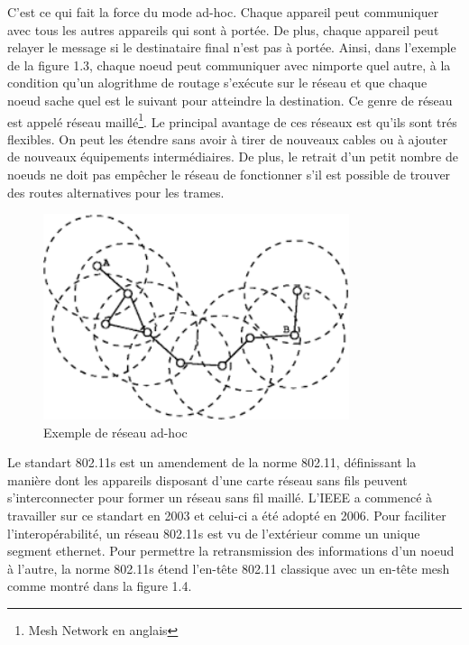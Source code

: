 C'est ce qui fait la force du mode ad-hoc. Chaque appareil peut communiquer avec tous les autres appareils qui sont à portée.
De plus, chaque appareil peut relayer le message si le destinataire final n'est pas à portée. Ainsi, dans l'exemple de
la figure 1.3, chaque noeud peut communiquer avec nimporte quel autre, à la condition qu'un alogrithme de routage s'exécute
sur le réseau et que chaque noeud sache quel est le suivant pour atteindre la destination. Ce genre de réseau est appelé réseau
maillé\footnote{Mesh Network en anglais}. Le principal avantage de ces réseaux est qu'ils sont trés flexibles. On peut les étendre
sans avoir à tirer de nouveaux cables ou à ajouter de nouveaux équipements intermédiaires\cite{MNintro}. De plus, le retrait d'un
petit nombre de noeuds ne doit pas empêcher le réseau de fonctionner s'il est possible de trouver des routes alternatives pour
les trames.
\begin{figure}
   \centering
   \includegraphics[width=0.8\textwidth,natwidth=488,natheight=513]{images/ad_hoc.png}
   \caption{Exemple de réseau ad-hoc}
\end{figure}

Le standart 802.11s est un amendement de la norme 802.11, définissant la manière dont les appareils disposant d'une carte réseau
sans fils peuvent s'interconnecter pour former un réseau sans fil maillé. L'IEEE a commencé à travailler sur ce standart en 
2003 et celui-ci a été adopté en 2006. Pour faciliter l'interopérabilité, un réseau 802.11s est vu de l'extérieur comme un
unique segment ethernet. Pour permettre la retransmission des informations d'un noeud à l'autre, la norme 802.11s
étend l'en-tête 802.11 classique avec un en-tête mesh comme montré dans la figure 1.4\cite{MNfunc}.

